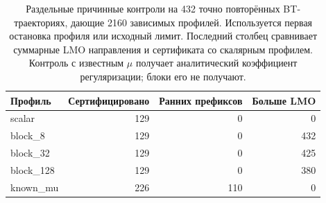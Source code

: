 \begin{table}[htbp]
\centering\small
\caption{Раздельные причинные контроли на 432 точно повторённых BT-траекториях, дающие 2160 зависимых профилей. Используется первая остановка профиля или исходный лимит. Последний столбец сравнивает суммарные LMO направления и сертификата со скалярным профилем. Контроль с известным $\mu$ получает аналитический коэффициент регуляризации; блоки его не получают.}
\label{tab:monitors}
\begin{tabular}{lrrr}
\toprule
Профиль & Сертифицировано & Ранних префиксов & Больше LMO \\
\midrule
scalar & 129 & 0 & 0 \\
block\_8 & 129 & 0 & 432 \\
block\_32 & 129 & 0 & 425 \\
block\_128 & 129 & 0 & 380 \\
known\_mu & 226 & 110 & 0 \\
\bottomrule
\end{tabular}
\end{table}
